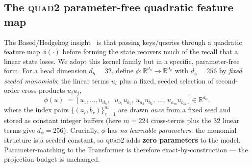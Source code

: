 \documentclass[11pt]{article}
\newcommand{\dphi}{d_{\phi}}
\newcommand{\dhd}{d_{h}}
\newcommand{\R}{\mathbb{R}}
\newcommand{\quadtwo}{\textsc{quad2}}
\begin{document}
\subsection{The \quadtwo{} parameter-free quadratic feature map}
The Based/Hedgehog insight~\cite{arora2024based,zhang2024hedgehog} is that passing keys/queries
through a quadratic feature map $\phi(\cdot)$ before forming the state recovers much of the recall
that a linear state loses. We adopt this kernel family but in a specific, parameter-free form.
For a head dimension $\dhd{=}32$, define $\phi:\R^{\dhd}\!\to\!\R^{\dphi}$ with $\dphi{=}256$ by
\emph{fixed seeded monomials}: the linear terms $u_i$ plus a fixed, seeded selection of
second-order cross-products $u_i u_j$,
\begin{equation}
\phi(u) \;=\; \big[\, u_1,\dots,u_{\dhd},\;\; u_{a_1}u_{b_1},\, u_{a_2}u_{b_2},\,\dots,\,
u_{a_m}u_{b_m} \,\big] \in \R^{\dphi},
\label{eq:quad2}
\end{equation}
where the index pairs $\{(a_r,b_r)\}_{r=1}^{m}$ are drawn \emph{once} from a fixed seed and stored
as constant integer buffers (here $m=224$ cross-terms plus the $32$ linear terms give
$\dphi{=}256$). Crucially, $\phi$ has \emph{no learnable parameters}: the monomial structure is a
seeded constant, so \quadtwo{} adds \textbf{zero parameters} to the model. Parameter-matching to the
Transformer is therefore exact-by-construction --- the projection budget is unchanged.
\end{document}
